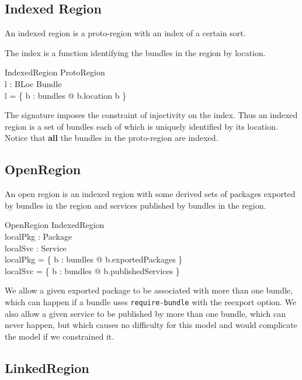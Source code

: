 \documentclass[a4paper,9pt]{article}
\begin{document}
\subsection{Indexed Region}

An indexed region is a proto-region with an index of a certain sort.

The index is a function identifying the bundles in the region by location.
\begin{schema}{IndexedRegion}
  ProtoRegion \\
  l : BLoc \pinj Bundle \\
\where
  l = \{ b : bundles @ b.location \mapsto b \} \\
\end{schema}
The signature imposes the constraint of injectivity on the index.
Thus an indexed region is a set of bundles each of which is uniquely identified
by its location.
Notice that \textbf{all} the bundles in the proto-region are indexed.

\subsection{OpenRegion}

An open region is an indexed region with some derived sets of packages exported by bundles in the region
and services published by bundles in the region.

\begin{schema}{OpenRegion}
  IndexedRegion \\
  localPkg : \power Package \\
  localSvc : \power Service \\
\where
  localPkg = \bigcup \{ b : bundles @ b.exportedPackages \} \\
  localSvc = \bigcup \{ b : bundles @ b.publishedServices \} \\
\end{schema}
We allow a given exported package to be associated with more than one bundle, which can happen if a bundle uses
\texttt{require-bundle} with the reexport option.
We also allow a given service to be published by more than one bundle, which can never happen, but which causes
no difficulty for this model and would complicate the model if we constrained it.

\subsection{LinkedRegion}
\end{document}
